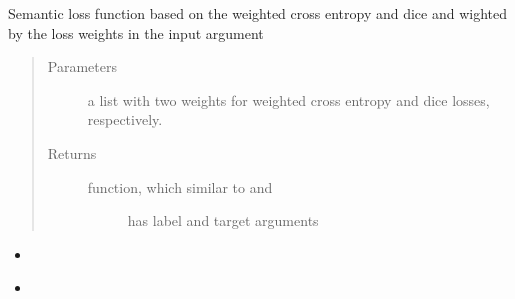 \documentclass[letterpaper,10pt,english]{sphinxmanual}
\begin{document}

\begin{fulllineitems}
\label{\detokenize{index:boundary.loss.multi_loss_fun}}
Semantic loss function based on the weighted cross entropy and dice and wighted by the loss weights in the input
argument
\begin{quote}\begin{description}
\item[{Parameters}] \leavevmode
{} \textendash{} a list with two weights for weighted cross entropy and dice losses, respectively.

\item[{Returns}] \leavevmode
\begin{description}
\item[{function, which similar to {\hyperref[\detokenize{index:boundary.loss.weighted_cross_entropy}]{}} and {\hyperref[\detokenize{index:boundary.loss.dice_loss}]{}}}] \leavevmode
has label and target arguments

\end{description}


\end{description}\end{quote}



\begin{itemize}
\item {} 
{\hyperref[\detokenize{index:boundary.loss.weighted_cross_entropy}]{}}

\item {} 
{\hyperref[\detokenize{index:boundary.loss.dice_loss}]{}}

\end{itemize}



\end{fulllineitems}

\end{document}
